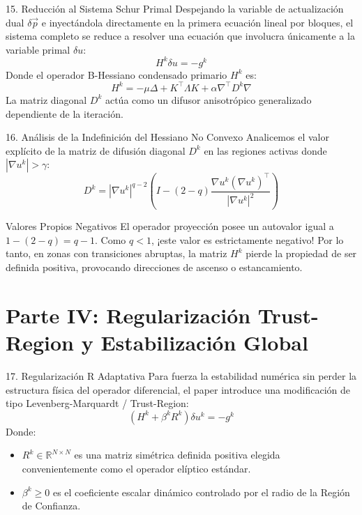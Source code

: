 \documentclass[aspectratio=169,11pt]{beamer}
\begin{document}
\begin{frame}{15. Reducción al Sistema Schur Primal}
    Despejando la variable de actualización dual $\delta \vec{p}$ e inyectándola directamente en la primera ecuación lineal por bloques, el sistema completo se reduce a resolver una ecuación que involucra únicamente a la variable primal $\delta u$:
    \begin{equation}
        H^k \delta u = -g^k
    \end{equation}
    Donde el operador B-Hessiano condensado primario $H^k$ es:
    \begin{equation}
        H^k = -\mu \Delta + K^\top \Lambda K + \alpha \nabla^\top D^k \nabla
    \end{equation}
    La matriz diagonal $D^k$ actúa como un difusor anisotrópico generalizado dependiente de la iteración.
\end{frame}

\begin{frame}{16. Análisis de la Indefinición del Hessiano No Convexo}
    Analicemos el valor explícito de la matriz de difusión diagonal $D^k$ en las regiones activas donde $|\nabla u^k| > \gamma$:
    \begin{equation}
        D^k = |\nabla u^k|^{q-2} \left( I - (2-q) \frac{\nabla u^k (\nabla u^k)^\top}{|\nabla u^k|^2} \right)
    \end{equation}
    \begin{alertblock}{Valores Propios Negativos}
        El operador proyección posee un autovalor igual a $1 - (2-q) = q - 1$. Como $q < 1$, ¡este valor es \alert{estrictamente negativo}! Por lo tanto, en zonas con transiciones abruptas, la matriz $H^k$ pierde la propiedad de ser definida positiva, provocando direcciones de ascenso o estancamiento.
    \end{alertblock}
\end{frame}

\section{Parte IV: Regularización Trust-Region y Estabilización Global}

\begin{frame}{17. Regularización R Adaptativa}
    Para fuerza la estabilidad numérica sin perder la estructura física del operador diferencial, el paper introduce una modificación de tipo Levenberg-Marquardt / Trust-Region:
    \begin{equation}
        (H^k + \beta^k R^k) \delta u^k = -g^k
    \end{equation}
    Donde:
    \begin{itemize}
        \item $R^k \in \mathbb{R}^{N \times N}$ es una matriz simétrica definida positiva elegida convenientemente como el operador elíptico estándar.
        \item $\beta^k \ge 0$ es el coeficiente escalar dinámico controlado por el radio de la Región de Confianza.
    \end{itemize}
\end{frame}
\end{document}
